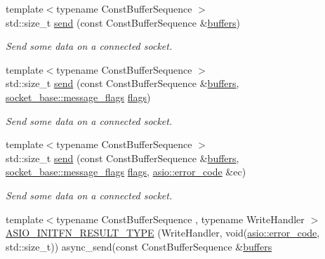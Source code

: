 \begin{DoxyCompactItemize}
{\footnotesize template$<$typename Const\+Buffer\+Sequence $>$ }\\std\+::size\+\_\+t \hyperlink{classasio_1_1basic__raw__socket_ae22529de4ab3444e3d80707b11e2b8c5}{send} (const Const\+Buffer\+Sequence \&\hyperlink{group__async__read_ga54dede45c3175148a77fe6635222c47d}{buffers})
\begin{DoxyCompactList}\small\item\em Send some data on a connected socket. \end{DoxyCompactList}\item 
{\footnotesize template$<$typename Const\+Buffer\+Sequence $>$ }\\std\+::size\+\_\+t \hyperlink{classasio_1_1basic__raw__socket_a664b9dd4f00cd9dd3a7e797571c7dd18}{send} (const Const\+Buffer\+Sequence \&\hyperlink{group__async__read_ga54dede45c3175148a77fe6635222c47d}{buffers}, \hyperlink{classasio_1_1socket__base_ac3cf77465dfedfe1979b5415cf32cc94}{socket\+\_\+base\+::message\+\_\+flags} \hyperlink{classasio_1_1basic__raw__socket_a324289af06e6526b244c1074db009c3f}{flags})
\begin{DoxyCompactList}\small\item\em Send some data on a connected socket. \end{DoxyCompactList}\item 
{\footnotesize template$<$typename Const\+Buffer\+Sequence $>$ }\\std\+::size\+\_\+t \hyperlink{classasio_1_1basic__raw__socket_ac91b8f6701b16c5abf974d18fec58d4c}{send} (const Const\+Buffer\+Sequence \&\hyperlink{group__async__read_ga54dede45c3175148a77fe6635222c47d}{buffers}, \hyperlink{classasio_1_1socket__base_ac3cf77465dfedfe1979b5415cf32cc94}{socket\+\_\+base\+::message\+\_\+flags} \hyperlink{classasio_1_1basic__raw__socket_a324289af06e6526b244c1074db009c3f}{flags}, \hyperlink{classasio_1_1error__code}{asio\+::error\+\_\+code} \&ec)
\begin{DoxyCompactList}\small\item\em Send some data on a connected socket. \end{DoxyCompactList}\item 
{\footnotesize template$<$typename Const\+Buffer\+Sequence , typename Write\+Handler $>$ }\\\hyperlink{classasio_1_1basic__raw__socket_a54cf87e28b67267f43f5869b894ca7a4}{A\+S\+I\+O\+\_\+\+I\+N\+I\+T\+F\+N\+\_\+\+R\+E\+S\+U\+L\+T\+\_\+\+T\+Y\+P\+E} (Write\+Handler, void(\hyperlink{classasio_1_1error__code}{asio\+::error\+\_\+code}, std\+::size\+\_\+t)) async\+\_\+send(const Const\+Buffer\+Sequence \&\hyperlink{group__async__read_ga54dede45c3175148a77fe6635222c47d}{buffers}

\end{DoxyCompactItemize}
